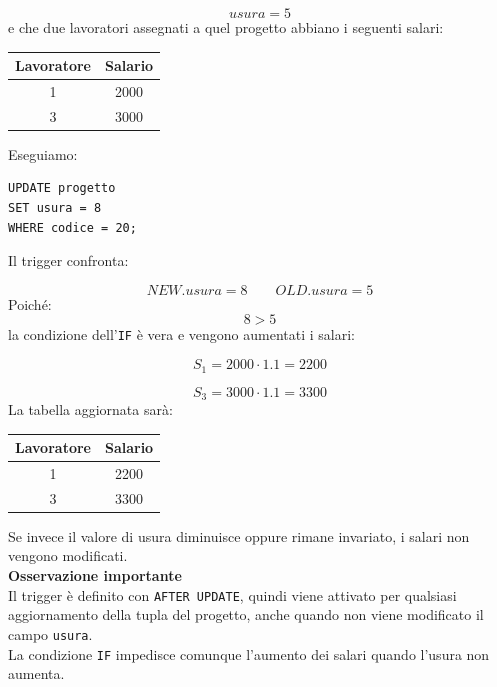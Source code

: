\[
usura = 5
\]
e che due lavoratori assegnati a quel progetto
abbiano i seguenti salari:
\begin{center}
\begin{tabular}{|c|c|}
\hline
Lavoratore & Salario \\
\hline
1 & 2000 \\
3 & 3000 \\
\hline
\end{tabular}
\end{center}
\noindent
Eseguiamo:
\begin{verbatim}
UPDATE progetto
SET usura = 8
WHERE codice = 20;
\end{verbatim}
\noindent
Il trigger confronta:

\[
NEW.usura = 8
\qquad
OLD.usura = 5
\]
Poiché:
\[
8 > 5
\]
la condizione dell'\texttt{IF} è vera
e vengono aumentati i salari:

\[
S_1 = 2000 \cdot 1.1 = 2200
\]

\[
S_3 = 3000 \cdot 1.1 = 3300
\]
La tabella aggiornata sarà:
\begin{center}
\begin{tabular}{|c|c|}
\hline
Lavoratore & Salario \\
\hline
1 & 2200 \\
3 & 3300 \\
\hline
\end{tabular}
\end{center}
\noindent
Se invece il valore di usura diminuisce
oppure rimane invariato, i salari
non vengono modificati.\medskip\\
\textbf{Osservazione importante}\\
Il trigger è definito con \texttt{AFTER UPDATE},
quindi viene attivato per qualsiasi aggiornamento
della tupla del progetto, anche quando
non viene modificato il campo \texttt{usura}.\\
La condizione \texttt{IF} impedisce comunque
l'aumento dei salari quando l'usura non aumenta.